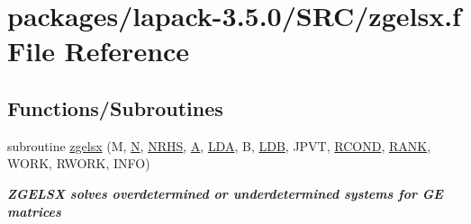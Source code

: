 \hypertarget{zgelsx_8f}{}\section{packages/lapack-\/3.5.0/\+S\+R\+C/zgelsx.f File Reference}
\label{zgelsx_8f}
\subsection*{Functions/\+Subroutines}
\begin{DoxyCompactItemize}
\item 
subroutine \hyperlink{group__complex16GEsolve_ga2f5a7b554bd143d8588b9ba5d6a8985c}{zgelsx} (M, \hyperlink{polmisc_8c_a0240ac851181b84ac374872dc5434ee4}{N}, \hyperlink{example__user_8c_aa0138da002ce2a90360df2f521eb3198}{N\+R\+H\+S}, \hyperlink{classA}{A}, \hyperlink{example__user_8c_ae946da542ce0db94dced19b2ecefd1aa}{L\+D\+A}, B, \hyperlink{example__user_8c_a50e90a7104df172b5a89a06c47fcca04}{L\+D\+B}, J\+P\+V\+T, \hyperlink{superlu__enum__consts_8h_af00a42ecad444bbda75cde1b64bd7e72a9b5c151728d8512307565994c89919d5}{R\+C\+O\+N\+D}, \hyperlink{splinemodule_8c_a3a88bcc63386de30443dacede2e01847}{R\+A\+N\+K}, W\+O\+R\+K, R\+W\+O\+R\+K, I\+N\+F\+O)
\begin{DoxyCompactList}\small\item\em {\bfseries  Z\+G\+E\+L\+S\+X solves overdetermined or underdetermined systems for G\+E matrices} \end{DoxyCompactList}\end{DoxyCompactItemize}
